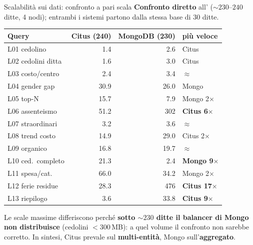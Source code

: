 \documentclass[aspectratio=169,11pt]{beamer}
\begin{document}
\begin{frame}{Scalabilità sui dati: confronto a pari scala}
  \small \textbf{Confronto diretto} all' (${\sim}230$--$240$ ditte, 4 nodi); entrambi i sistemi partono dalla stessa base di 30 ditte.
  \vspace{0.1em}
  \centering
  \scriptsize
  \setlength{\tabcolsep}{5pt}
  \renewcommand{\arraystretch}{0.92}
  \begin{tabular}{@{}l >{\columncolor{pgblu!9}}r >{\columncolor{mongoverde!9}}r l@{}}
    \toprule
    \textbf{Query} & \textcolor{pgblu}{\textbf{Citus}} (240) & \textcolor{mongoverde}{\textbf{MongoDB}} (230) & \textbf{più veloce} \\
    \midrule
    L01 cedolino        & 1.4  & 2.6  & \textcolor{pgblu}{Citus} \\
    L02 cedolini ditta  & 1.6  & 3.0  & \textcolor{pgblu}{Citus} \\
    L03 costo/centro    & 2.4  & 3.4  & \textcolor{grigio}{$\approx$} \\
    L04 gender gap      & 30.9 & 26.0 & \textcolor{mongoverde}{Mongo} \\
    L05 top-N           & 15.7 & 7.9  & \textcolor{mongoverde}{Mongo 2$\times$} \\
    L06 assenteismo     & 51.2 & 302  & \textcolor{pgblu}{\textbf{Citus 6$\times$}} \\
    L07 straordinari    & 3.2  & 3.6  & \textcolor{grigio}{$\approx$} \\
    L08 trend costo     & 14.9 & 29.0 & \textcolor{pgblu}{Citus 2$\times$} \\
    L09 organico        & 16.8 & 19.7 & \textcolor{grigio}{$\approx$} \\
    L10 ced.\ completo  & 21.3 & 2.4  & \textcolor{mongoverde}{\textbf{Mongo 9$\times$}} \\
    L11 spesa/cat.      & 66.0 & 34.2 & \textcolor{mongoverde}{Mongo 2$\times$} \\
    L12 ferie residue   & 28.3 & 476  & \textcolor{pgblu}{\textbf{Citus 17$\times$}} \\
    L13 riepilogo       & 3.6  & 33.8 & \textcolor{pgblu}{\textbf{Citus 9$\times$}} \\
    \bottomrule
  \end{tabular}
  \par\vspace{0.15em}
  {\scriptsize\color{grigio} Le scale massime differiscono perché \textbf{sotto ${\sim}230$ ditte il balancer di Mongo non distribuisce} (cedolini ${<}300$\,MB): a quel volume il confronto non sarebbe corretto. In sintesi, Citus prevale sul \textcolor{pgblu}{\textbf{multi-entità}}, Mongo sull'\textcolor{mongoverde}{\textbf{aggregato}}.}
\end{frame}
\end{document}
